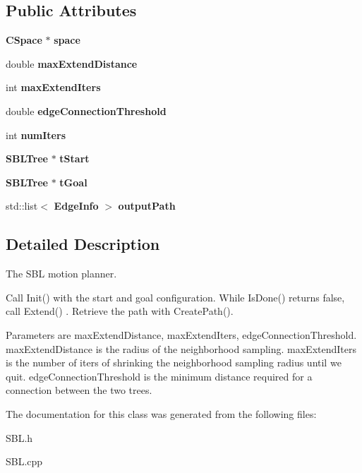 \subsection*{Public Attributes}
\begin{DoxyCompactItemize}
\item 
{\bf C\+Space} $\ast$ {\bfseries space}\label{classSBLPlanner_ae967b2aec44781dfc10390fc4271c4c9}

\item 
double {\bfseries max\+Extend\+Distance}\label{classSBLPlanner_a5f708507dc2086c6021fc71b521b89be}

\item 
int {\bfseries max\+Extend\+Iters}\label{classSBLPlanner_a654954ceca455738212fec15ec5b65c2}

\item 
double {\bfseries edge\+Connection\+Threshold}\label{classSBLPlanner_ae89e7029457ab560ef036aa6815b6420}

\item 
int {\bfseries num\+Iters}\label{classSBLPlanner_a04d8e3976fd27a1e13afacedcf54c57e}

\item 
{\bf S\+B\+L\+Tree} $\ast$ {\bfseries t\+Start}\label{classSBLPlanner_a62122ad392d5c41577b7007f43e352aa}

\item 
{\bf S\+B\+L\+Tree} $\ast$ {\bfseries t\+Goal}\label{classSBLPlanner_a868c99b7fdb9304260634336b56e70e4}

\item 
std\+::list$<$ {\bf Edge\+Info} $>$ {\bfseries output\+Path}\label{classSBLPlanner_aee8ab7d492e1e868b918714a233d931a}

\end{DoxyCompactItemize}


\subsection{Detailed Description}
The S\+BL motion planner. 

Call Init() with the start and goal configuration. While Is\+Done() returns false, call Extend() . Retrieve the path with Create\+Path().

Parameters are max\+Extend\+Distance, max\+Extend\+Iters, edge\+Connection\+Threshold. max\+Extend\+Distance is the radius of the neighborhood sampling. max\+Extend\+Iters is the number of iters of shrinking the neighborhood sampling radius until we quit. edge\+Connection\+Threshold is the minimum distance required for a connection between the two trees. 

The documentation for this class was generated from the following files\+:\begin{DoxyCompactItemize}
\item 
S\+B\+L.\+h\item 
S\+B\+L.\+cpp\end{DoxyCompactItemize}
